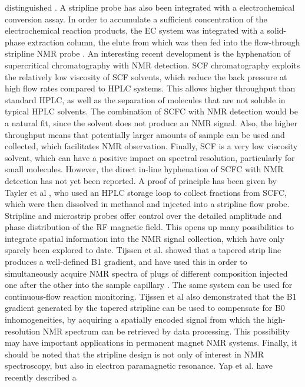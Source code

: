 distinguished \cite{Goswami:2014ha}. A stripline probe has also been
integrated with a electrochemical conversion assay. In order to
accumulate a sufficient concentration of the electrochemical reaction
products, the EC system was integrated with a solid-phase extraction
column, the elute from which was then fed into the flow-through
stripline NMR probe \cite{Falck:2013kv,Falck:2015eu}. An interesting recent
development is the hyphenation of supercritical  chromatography
with NMR detection. SCF chromatography exploits the relatively low
viscosity of SCF solvents, which reduce the back pressure at high flow
rates compared to HPLC systems. This allows higher throughput than
standard HPLC, as well as the separation of molecules that are not
soluble in typical HPLC solvents. The combination of SCFC with NMR
detection would be a natural fit, since the solvent does not produce an
NMR signal. Also, the higher throughput means that potentially larger
amounts of sample can be used and collected, which facilitates NMR
observation. Finally, SCF  is a very low viscosity solvent, which
can have a positive impact on spectral resolution, particularly for
small molecules. However, the direct in-line hyphenation of SCFC with
NMR detection has not yet been reported. A proof of principle has been
given by Tayler et al \cite{Tayler:2015gn}, who used an HPLC storage loop
to collect fractions from SCFC, which were then dissolved in methanol
and injected into a stripline flow probe. Stripline and microstrip
probes offer control over the detailed amplitude and phase distribution
of the RF magnetic field. This opens up many possibilities to integrate
spatial information into the NMR signal collection, which have only
sparely been explored to date. Tijssen et al. showed that a tapered
strip line produces a well-defined B1 gradient, and have used this in
order to simultaneously acquire NMR spectra of plugs of different
composition injected one after the other into the sample capillary
\cite{Tijssen:2016hu}. The same system can be used for continuous-flow
reaction monitoring. Tijssen et al also demonstrated that the B1
gradient generated by the tapered stripline can be used to compensate
for B0 inhomogeneities, by acquiring a spatially encoded signal from
which the high-resolution NMR spectrum can be retrieved by data
processing. This possibility may have important applications in
permanent magnet NMR systems. Finally, it should be noted that the
stripline design is not only of interest in NMR spectroscopy, but also
in electron paramagnetic resonance. Yap et al. have recently described a
